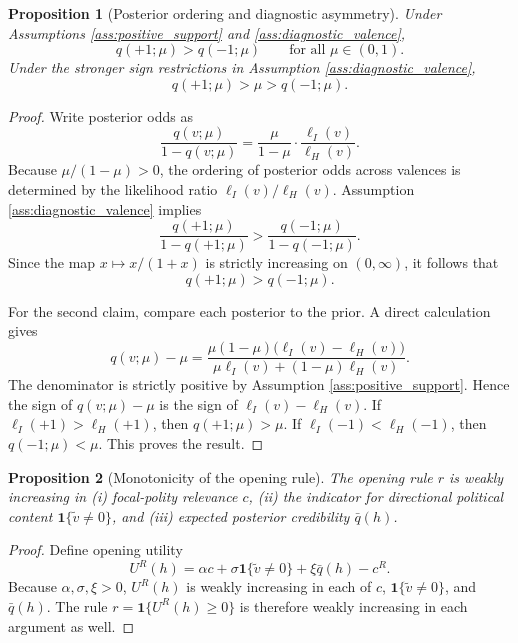\documentclass[12pt,american]{article}
\newtheorem{proposition}{Proposition}
\begin{document}
\begin{refsection}
		\begin{proposition}[Posterior ordering and diagnostic asymmetry]
			\label{prop:posterior_ordering}
			Under Assumptions \ref{ass:positive_support} and \ref{ass:diagnostic_valence},
			\[
			q(+1;\mu)>q(-1;\mu)
			\qquad\text{for all } \mu\in(0,1).
			\]
			Under the stronger sign restrictions in Assumption \ref{ass:diagnostic_valence},
			\[
			q(+1;\mu)>\mu>q(-1;\mu).
			\]
		\end{proposition}
		
		\begin{proof}
			Write posterior odds as
			\[
			\frac{q(v;\mu)}{1-q(v;\mu)}
			=
			\frac{\mu}{1-\mu}\cdot \frac{\ell_I(v)}{\ell_H(v)}.
			\]
			Because \(\mu/(1-\mu)>0\), the ordering of posterior odds across valences is determined by the likelihood ratio \(\ell_I(v)/\ell_H(v)\). Assumption \ref{ass:diagnostic_valence} implies
			\[
			\frac{q(+1;\mu)}{1-q(+1;\mu)}
			>
			\frac{q(-1;\mu)}{1-q(-1;\mu)}.
			\]
			Since the map \(x\mapsto x/(1+x)\) is strictly increasing on \((0,\infty)\), it follows that
			\[
			q(+1;\mu)>q(-1;\mu).
			\]
			
			For the second claim, compare each posterior to the prior. A direct calculation gives
			\[
			q(v;\mu)-\mu
			=
			\frac{\mu(1-\mu)\big(\ell_I(v)-\ell_H(v)\big)}
			{\mu \ell_I(v)+(1-\mu)\ell_H(v)}.
			\]
			The denominator is strictly positive by Assumption \ref{ass:positive_support}. Hence the sign of \(q(v;\mu)-\mu\) is the sign of \(\ell_I(v)-\ell_H(v)\). If \(\ell_I(+1)>\ell_H(+1)\), then \(q(+1;\mu)>\mu\). If \(\ell_I(-1)<\ell_H(-1)\), then \(q(-1;\mu)<\mu\). This proves the result.
		\end{proof}
		
		\begin{proposition}[Monotonicity of the opening rule]
			\label{prop:opening_monotonicity}
				The opening rule \(r\) is weakly increasing in (i) focal-polity relevance \(c\), (ii) the indicator for directional political content \(\mathbf{1}\{\tilde v\neq 0\}\), and (iii) expected posterior credibility \(\bar q(h)\).
		\end{proposition}
		
		\begin{proof}
			Define opening utility
			\[
			U^R(h)=\alpha c+\sigma \mathbf{1}\{\tilde v\neq 0\}+\xi \bar q(h)-c^R.
			\]
			Because \(\alpha,\sigma,\xi>0\), \(U^R(h)\) is weakly increasing in each of \(c\), \(\mathbf{1}\{\tilde v\neq 0\}\), and \(\bar q(h)\). The rule \(r=\mathbf{1}\{U^R(h)\ge 0\}\) is therefore weakly increasing in each argument as well.
		\end{proof}
		

\end{refsection}
\end{document}
